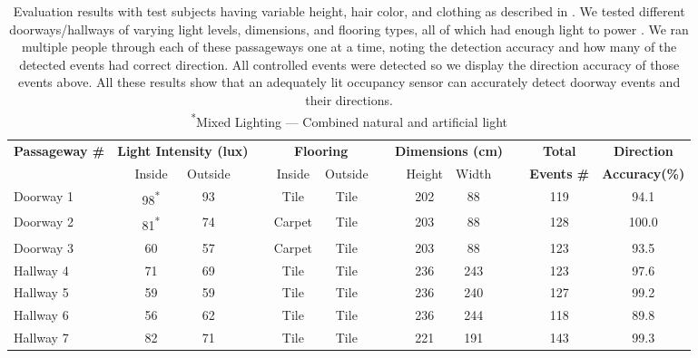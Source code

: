 \begin{table}[t]
	\footnotesize
		\begin{tabular}{@{}p{1.0in}p{0.04in}ccp{0.04in}p{0.04in}ccp{0.04in}p{0.04in}ccp{0.04in}p{0.04in}cc@{}}
		\toprule
		\multirow{2}{*}{\textbf{Passageway \#}} & \multicolumn{4}{c}{\textbf{Light Intensity (lux)}} & \multicolumn{4}{c}{\textbf{Flooring}} & \multicolumn{4}{c}{\textbf{Dimensions (cm)}} & & \textbf{Total} & \textbf{Direction} 		\\
		          & & Inside & Outside & & & Inside & Outside & & & Height & Width & & & \textbf{Events \#} & \textbf{Accuracy(\%)}\\\midrule
		Doorway 1 & & 98\textsuperscript{*} & 93 & & & Tile   & Tile & & & 202 & 88  & & & 119 & 94.1    \\  %
		Doorway 2 & & 81\textsuperscript{*} & 74 & & & Carpet & Tile & & & 203 & 88  & & & 128 & 100.0   \\  %
		Doorway 3 & & 60                    & 57 & & & Carpet & Tile & & & 203 & 88  & & & 123 & 93.5    \\  %
		Hallway 4 & & 71                    & 69 & & & Tile   & Tile & & & 236 & 243 & & & 123 & 97.6    \\  %
		Hallway 5 & & 59                    & 59 & & & Tile   & Tile & & & 236 & 240 & & & 127 & 99.2    \\  %
		Hallway 6 & & 56                    & 62 & & & Tile   & Tile & & & 236 & 244 & & & 118 & 89.8    \\  %
		Hallway 7 & & 82                    & 71 & & & Tile   & Tile & & & 221 & 191  & & & 143 & 99.3    \\  %
		\bottomrule
		\end{tabular}
		\caption{Evaluation results with \numPeople test subjects having variable height, hair color, and clothing as described in . We tested \numDoors different doorways/hallways of varying light levels, dimensions, and flooring types, all of which had enough light to power \sysname. We ran multiple people through each of these \numDoors passageways one at a time, noting the detection accuracy and how many of the detected events had correct direction. All controlled events were detected so we display the direction accuracy of those events above.  All these results show that an adequately lit \sysname occupancy sensor can accurately detect doorway events and their directions.
		\vspace{1mm}
		\\\textsuperscript{*}Mixed Lighting --- Combined natural and artificial light
		\label{tab:detection}}
	
	\end{table}	

